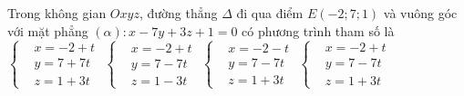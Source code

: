 \begin{ex}%
	Trong không gian $Oxyz$, đường thẳng $\Delta$ đi qua điểm $E(-2;7;1)$ và vuông góc với mặt phẳng $\left(\alpha \right) \colon x-7y+3z+1=0$ có phương trình tham số là
	\choice
	{$\left\{\begin{aligned}
		&x=-2+t \\
		&y=7+7t \\
		&z=1+3t
		\end{aligned}\right. $}
	{$\left\{\begin{aligned}
		&x=-2+t \\
		&y=7-7t \\
		&z=1-3t
		\end{aligned}\right. $}
	{$\left\{\begin{aligned}
		&x=-2-t \\
		&y=7-7t \\
		&z=1+3t
		\end{aligned}\right. $}
	{\True $\left\{\begin{aligned}
		&x=-2+t \\
		&y=7-7t \\
		&z=1+3t
		\end{aligned}\right. $}
\end{ex}

